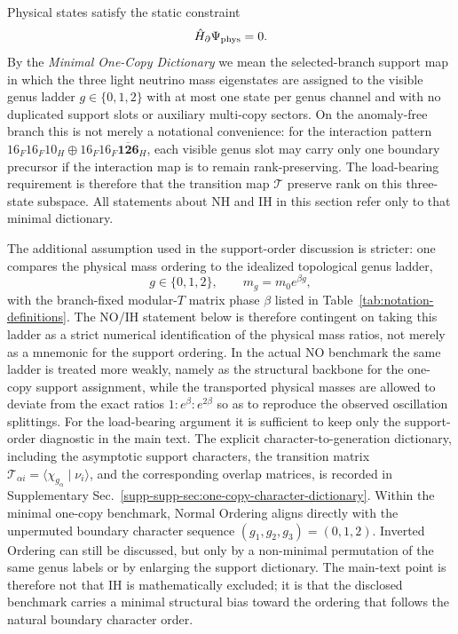 \documentclass[11pt]{article}
\begin{document}
Physical states satisfy the static constraint
\begin{equation}
 \hat H_{\partial}\Psi_{\rm phys}=0.
\end{equation}
By the \emph{Minimal One-Copy Dictionary} we mean the selected-branch support map in which the three light neutrino mass eigenstates are assigned to the visible genus ladder $g\in\{0,1,2\}$ with at most one state per genus channel and with no duplicated support slots or auxiliary multi-copy sectors. On the anomaly-free branch this is not merely a notational convenience: for the interaction pattern $16_F16_F10_H\oplus16_F16_F\overline{\mathbf{126}}_H$, each visible genus slot may carry only one boundary precursor if the interaction map is to remain rank-preserving. The load-bearing requirement is therefore that the transition map $\mathcal T$ preserve rank on this three-state subspace. All statements about NH and IH in this section refer only to that minimal dictionary.

The additional assumption used in the support-order discussion is stricter: one compares the physical mass ordering to the idealized topological genus ladder,
\begin{equation}
 g\in\{0,1,2\},
 \qquad
 m_g = m_0e^{\beta g},
\end{equation}
with the branch-fixed modular-$T$ matrix phase $\beta$ listed in Table~\ref{tab:notation-definitions}.
The NO/IH statement below is therefore contingent on taking this ladder as a strict numerical identification of the physical mass ratios, not merely as a mnemonic for the support ordering. In the actual NO benchmark the same ladder is treated more weakly, namely as the structural backbone for the one-copy support assignment, while the transported physical masses are allowed to deviate from the exact ratios $1:e^{\beta}:e^{2\beta}$ so as to reproduce the observed oscillation splittings.
For the load-bearing argument it is sufficient to keep only the support-order diagnostic in the main text. The explicit character-to-generation dictionary, including the asymptotic support characters, the transition matrix $\mathcal T_{\alpha i}=\langle \chi_{g_{\alpha}}\mid\nu_i\rangle$, and the corresponding overlap matrices, is recorded in Supplementary Sec.~\ref{supp-supp-sec:one-copy-character-dictionary}. Within the minimal one-copy benchmark, Normal Ordering aligns directly with the unpermuted boundary character sequence $(g_1,g_2,g_3)=(0,1,2)$. Inverted Ordering can still be discussed, but only by a non-minimal permutation of the same genus labels or by enlarging the support dictionary. The main-text point is therefore not that IH is mathematically excluded; it is that the disclosed benchmark carries a minimal structural bias toward the ordering that follows the natural boundary character order.
\end{document}
